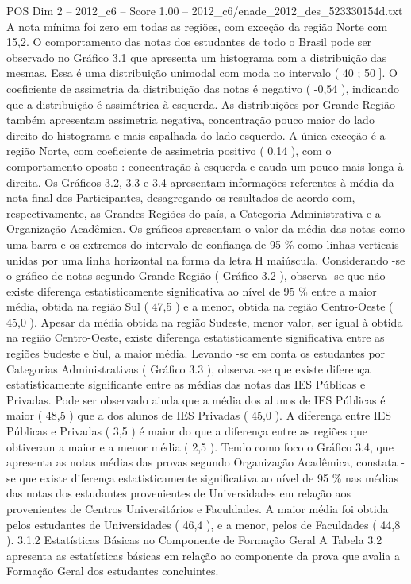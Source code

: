 \begin{textsample}{POS Dim 2 – 2012\_c6 – Score 1.00 – 2012\_c6/enade\_2012\_des\_523330154d.txt}
A nota mínima foi zero em todas as regiões, com exceção da região Norte com 15,2.
O comportamento das notas dos estudantes de todo o Brasil pode ser observado no Gráfico 3.1 que apresenta um histograma com a distribuição das mesmas.
Essa é uma distribuição unimodal com moda no intervalo ( 40 ; 50 ].
O coeficiente de assimetria da distribuição das notas é negativo ( -0,54 ), indicando que a distribuição é assimétrica à esquerda.
As distribuições por Grande Região também apresentam assimetria negativa, concentração pouco maior do lado direito do histograma e mais espalhada do lado esquerdo.
A única exceção é a região Norte, com coeficiente de assimetria positivo ( 0,14 ), com o comportamento oposto : concentração à esquerda e cauda um pouco mais longa à direita.
Os Gráficos 3.2, 3.3 e 3.4 apresentam informações referentes à média da nota final dos Participantes, desagregando os resultados de acordo com, respectivamente, as Grandes Regiões do país, a Categoria Administrativa e a Organização Acadêmica.
Os gráficos apresentam o valor da média das notas como uma barra e os extremos do intervalo de confiança de 95 \% como linhas verticais unidas por uma linha horizontal na forma da letra H maiúscula.
Considerando -se o gráfico de notas segundo Grande Região ( Gráfico 3.2 ), observa -se que não existe diferença estatisticamente significativa ao nível de 95 \% entre a maior média, obtida na região Sul ( 47,5 ) e a menor, obtida na região Centro-Oeste ( 45,0 ).
Apesar da média obtida na região Sudeste, menor valor, ser igual à obtida na região Centro-Oeste, existe diferença estatisticamente significativa entre as regiões Sudeste e Sul, a maior média.
Levando -se em conta os estudantes por Categorias Administrativas ( Gráfico 3.3 ), observa -se que existe diferença estatisticamente significante entre as médias das notas das IES Públicas e Privadas.
Pode ser observado ainda que a média dos alunos de IES Públicas é maior ( 48,5 ) que a dos alunos de IES Privadas ( 45,0 ).
A diferença entre IES Públicas e Privadas ( 3,5 ) é maior do que a diferença entre as regiões que obtiveram a maior e a menor média ( 2,5 ).
Tendo como foco o Gráfico 3.4, que apresenta as notas médias das provas segundo Organização Acadêmica, constata -se que existe diferença estatisticamente significativa ao nível de 95 \% nas médias das notas dos estudantes provenientes de Universidades em relação aos provenientes de Centros Universitários e Faculdades.
A maior média foi obtida pelos estudantes de Universidades ( 46,4 ), e a menor, pelos de Faculdades ( 44,8 ). 3.1.2 Estatísticas Básicas no Componente de Formação Geral A Tabela 3.2 apresenta as estatísticas básicas em relação ao componente da prova que avalia a Formação Geral dos estudantes concluintes.

\end{textsample}
